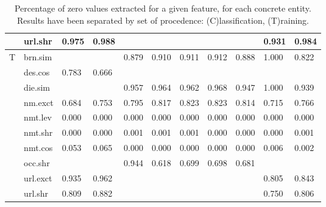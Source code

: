 \documentclass[epsfig,a4paper,11pt,titlepage,twoside,openany]{book}
\begin{document}
\begin{table}[H]
\begin{tabular}{ll|l|l|l|l|l|l|l|l|l|}
\multicolumn{1}{|l|}{}                                 & url.shr  & 0.975       & 0.988          &       &          &          &          &        & 0.931         & 0.984            \\ \hline \hline
\multicolumn{1}{|l|}{\multirow{10}{*}{T}}       & brn.sim  &             &                & 0.879 & 0.910    & 0.911    & 0.912    & 0.888  & 1.000         & 0.822            \\ \cline{2-11} 
\multicolumn{1}{|l|}{}                                 & des.cos  & 0.783       & 0.666          &       &          &          &          &        &               &                  \\ \cline{2-11} 
\multicolumn{1}{|l|}{}                                 & die.sim  &             &                & 0.957 & 0.964    & 0.962    & 0.968    & 0.947  & 1.000         & 0.939            \\ \cline{2-11} 
\multicolumn{1}{|l|}{}                                 & nm.exct  & 0.684       & 0.753          & 0.795 & 0.817    & 0.823    & 0.823    & 0.814  & 0.715         & 0.766            \\ \cline{2-11} 
\multicolumn{1}{|l|}{}                                 & nmt.lev  & 0.000       & 0.000          & 0.000 & 0.000    & 0.000    & 0.000    & 0.000  & 0.000         & 0.000            \\ \cline{2-11} 
\multicolumn{1}{|l|}{}                                 & nmt.shr  & 0.000       & 0.000          & 0.001 & 0.001    & 0.001    & 0.000    & 0.000  & 0.000         & 0.001            \\ \cline{2-11} 
\multicolumn{1}{|l|}{}                                 & nmt.cos  & 0.053       & 0.065          & 0.000 & 0.000    & 0.000    & 0.000    & 0.000  & 0.006         & 0.002            \\ \cline{2-11} 
\multicolumn{1}{|l|}{}                                 & occ.shr  &             &                & 0.944 & 0.618    & 0.699    & 0.698    & 0.681  &               &                  \\ \cline{2-11} 
\multicolumn{1}{|l|}{}                                 & url.exct & 0.935       & 0.962          &       &          &          &          &        & 0.805         & 0.843            \\ \cline{2-11} 
\multicolumn{1}{|l|}{}                                 & url.shr  & 0.809       & 0.882          &       &          &          &          &        & 0.750         & 0.806            \\ \hline \hline
\end{tabular}
\caption{Percentage of zero values extracted for a given feature, for each concrete entity. Results have been separated by set of procedence: (C)lassification, (T)raining.}
\label{tab:features-percentage-of-nans-or-zeroes}
\end{table}
\end{document}
